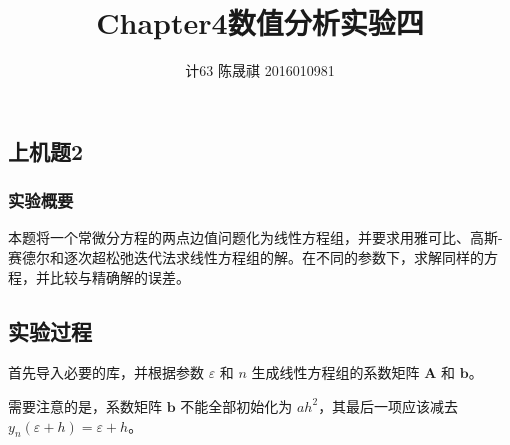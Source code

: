 \documentclass[11pt]{ctexart}
\title{Chapter4}
\begin{document}
	
	\title{数值分析实验四}
	\author{计63\,\,陈晟祺\,\,2016010981}
    
    
    \maketitle
    
    


    \subsection{上机题2}\label{ux4e0aux673aux98982}

\subsubsection{实验概要}\label{ux5b9eux9a8cux6982ux8981}

本题将一个常微分方程的两点边值问题化为线性方程组，并要求用雅可比、高斯-赛德尔和逐次超松弛迭代法求线性方程组的解。在不同的参数下，求解同样的方程，并比较与精确解的误差。

    \subsection{实验过程}\label{ux5b9eux9a8cux8fc7ux7a0b}

首先导入必要的库，并根据参数 \(\varepsilon\) 和 \(n\)
生成线性方程组的系数矩阵 \(\mathbf{A}\) 和 \(\mathbf{b}\)。

需要注意的是，系数矩阵 \(\mathbf{b}\) 不能全部初始化为
\(ah^2\)，其最后一项应该减去 \(y_n(\varepsilon+h)=\varepsilon+h\)。
\end{document}

